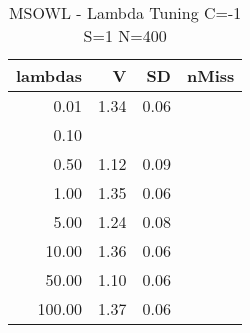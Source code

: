 \begin{table}[ht]
\centering
\begin{tabular}{rrrr}
  \hline
lambdas & V & SD & nMiss \\ 
  \hline
0.01 & 1.34 & 0.06 &  \\ 
  0.10 &  &  &  \\ 
  0.50 & 1.12 & 0.09 &  \\ 
  1.00 & 1.35 & 0.06 &  \\ 
  5.00 & 1.24 & 0.08 &  \\ 
  10.00 & 1.36 & 0.06 &  \\ 
  50.00 & 1.10 & 0.06 &  \\ 
  100.00 & 1.37 & 0.06 &  \\ 
   \hline
\end{tabular}
\caption{MSOWL - Lambda Tuning C=-1 S=1 N=400} 
\end{table}
